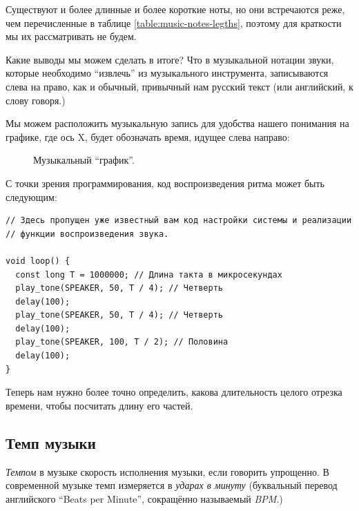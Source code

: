 \documentclass[a4paper,twoside]{book}
\begin{document}
Существуют и более длинные и более короткие ноты, но они встречаются реже, чем
перечисленные в таблице \ref{table:music-notes-legths}, поэтому для краткости мы
их рассматривать не будем.

Какие выводы мы можем сделать в итоге? Что в музыкальной нотации звуки, которые
необходимо ``извлечь'' из музыкального инструмента, записываются слева на право,
как и обычный, привычный нам русский текст (или английский, к слову говоря.)

Мы можем расположить музыкальную запись для удобства нашего понимания на
графике, где ось $\mbox{X}$, будет обозначать время, идущее слева направо:

\begin{figure}[ht]
  \caption{Музыкальный ``график''.}
  \centering

  \label{fig:lilypond-queen-1}
\end{figure}

С точки зрения программирования, код воспроизведения ритма может быть следующим:

\begin{verbatim}
// Здесь пропущен уже известный вам код настройки системы и реализации
// функции воспроизведения звука.

void loop() {
  const long T = 1000000; // Длина такта в микросекундах
  play_tone(SPEAKER, 50, T / 4); // Четверть
  delay(100);
  play_tone(SPEAKER, 50, T / 4); // Четверть
  delay(100);
  play_tone(SPEAKER, 100, T / 2); // Половина
  delay(100);
}
\end{verbatim}

Теперь нам нужно более точно определить, какова длительность целого отрезка
времени, чтобы посчитать длину его частей.

\subsection{Темп музыки}

\emph{Темпом} в музыке скорость исполнения музыки, если говорить упрощенно. В
современной музыке темп измеряется в \emph{ударах в минуту} (буквальный перевод
английского ``Beats per Minute'', сокращённо называемый \emph{BPM}.)
\end{document}
